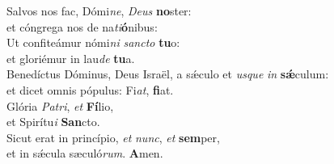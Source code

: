 \oddverse Salvos nos fac, Dómi\textit{ne}, \textit{De}\textit{us} \textbf{no}ster:~\*\\
\oddverse et cóngrega nos de na\textit{ti}\textbf{ó}nibus:\\
\evenverse Ut confiteámur nómi\textit{ni} \textit{san}\textit{cto} \textbf{tu}o:~\*\\
\evenverse et gloriémur in lau\textit{de} \textbf{tu}a.\\
\oddverse Benedíctus Dóminus, Deus Israël, a sǽculo et \textit{us}\textit{que} \textit{in} \textbf{sǽ}culum:~\*\\
\oddverse et dicet omnis pópulus: Fi\textit{at}, \textbf{fi}at.\\
\evenverse Glória \textit{Pa}\textit{tri}, \textit{et} \textbf{Fí}lio,~\*\\
\evenverse et Spirítu\textit{i} \textbf{San}cto.\\
\oddverse Sicut erat in princípio, \textit{et} \textit{nunc}, \textit{et} \textbf{sem}per,~\*\\
\oddverse et in sǽcula sæculó\textit{rum}. \textbf{A}men.\\
